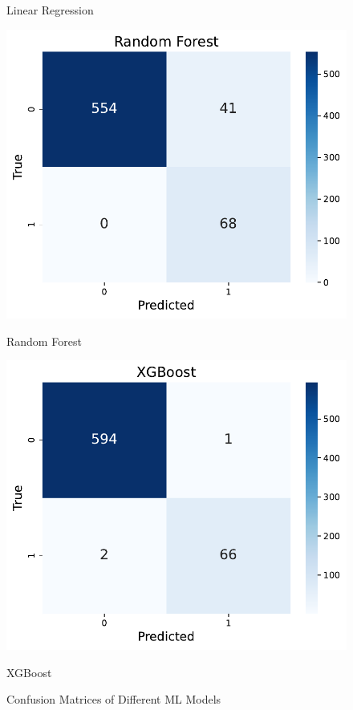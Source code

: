 \documentclass[10pt,letterpaper]{article}
\begin{document}
\begin{figure}[H]
\begin{minipage}{0.32\textwidth}
        \caption{Linear Regression}
        \label{fig:cm-linear}
    \end{minipage}\hfill
    \begin{minipage}{0.32\textwidth}
        \centering
        \includegraphics[width=\linewidth]{plots/random_forest_confusion_matrix.pdf}
        \caption{Random Forest}
        \label{fig:cm-random-forest}
    \end{minipage}\hfill
    \begin{minipage}{0.32\textwidth}
        \centering
        \includegraphics[width=\linewidth]{plots/xgboost_confusion_matrix.pdf}
        \caption{XGBoost}
        \label{fig:cm-xgboost}
    \end{minipage}
    \caption{Confusion Matrices of Different ML Models}
\end{figure}
\end{document}

